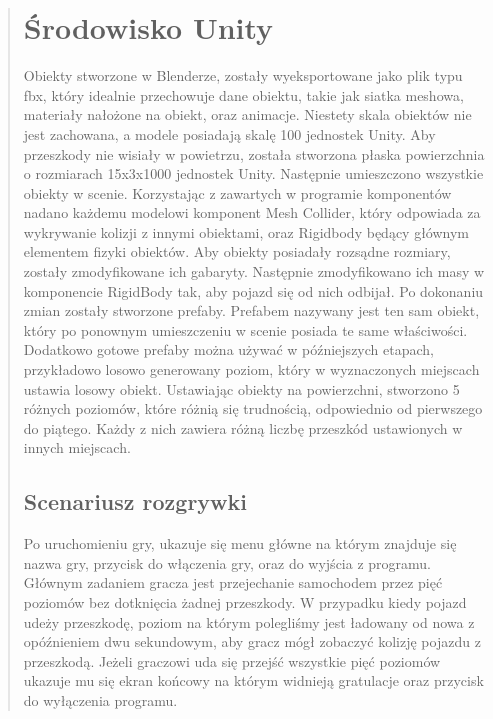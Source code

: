 \begin{quotation}
\section{Środowisko Unity}
\indent Obiekty stworzone w Blenderze, zostały wyeksportowane jako plik typu fbx, który idealnie przechowuje dane obiektu, takie jak siatka meshowa, materiały nałożone na obiekt, oraz animacje. Niestety skala obiektów nie jest zachowana, a modele posiadają skalę 100 jednostek Unity. Aby przeszkody nie wisiały w powietrzu, została stworzona płaska powierzchnia o rozmiarach 15x3x1000 jednostek Unity. Następnie umieszczono wszystkie obiekty w scenie. Korzystając z zawartych w programie komponentów nadano każdemu modelowi komponent Mesh Collider, który odpowiada za wykrywanie kolizji z innymi obiektami, oraz Rigidbody będący głównym elementem fizyki obiektów. Aby obiekty posiadały rozsądne rozmiary, zostały zmodyfikowane ich gabaryty. Następnie zmodyfikowano ich masy w komponencie RigidBody tak, aby pojazd się od nich odbijał. Po dokonaniu zmian zostały stworzone prefaby. Prefabem nazywany jest ten sam obiekt, który po ponownym umieszczeniu w scenie posiada te same właściwości. Dodatkowo gotowe prefaby można używać w późniejszych etapach, przykładowo losowo generowany poziom, który w wyznaczonych miejscach ustawia losowy obiekt. Ustawiając obiekty na powierzchni, stworzono 5 różnych poziomów, które różnią się trudnością, odpowiednio od pierwszego do piątego. Każdy z nich zawiera różną liczbę przeszkód ustawionych w innych miejscach. 


\newpage
\subsection{Scenariusz rozgrywki}
\indent Po uruchomieniu gry, ukazuje się menu główne na którym znajduje się nazwa gry, przycisk do włączenia gry, oraz do wyjścia z programu. Głównym zadaniem gracza jest przejechanie samochodem przez pięć poziomów bez dotknięcia żadnej przeszkody. W przypadku kiedy pojazd udeży przeszkodę, poziom na którym polegliśmy jest ładowany od nowa z opóźnieniem dwu sekundowym, aby gracz mógł zobaczyć kolizję pojazdu z przeszkodą. Jeżeli graczowi uda się przejść wszystkie pięć poziomów ukazuje mu się ekran końcowy na którym widnieją gratulacje oraz przycisk do wyłączenia programu.


\end{quotation}

